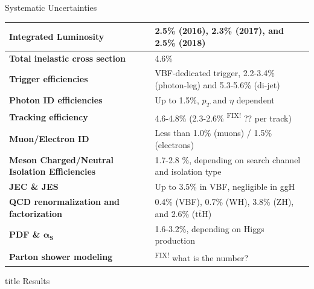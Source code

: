 \documentclass[9pt,aspectratio=1610]{beamer}
\newcommand{\pt}{\ensuremath{p_T}}
\newcommand{\ktodo}[1]{\colorbox{yellow!30}{{\color{red}\textsuperscript{\tiny FIX! }}#1}}
\begin{document}
\begin{frame}{Systematic Uncertainties}
	\begin{table}
		\small
		\begin{tabular}{l|l}
			\hline
			\textbf{Integrated Luminosity} & 2.5\% (2016), 2.3\% (2017), and 2.5\% (2018)\\
			\hline
			\textbf{Total inelastic cross section} & 4.6\%\\
			\hline
			\textbf{Trigger efficiencies} & VBF-dedicated trigger, 2.2-3.4\% (photon-leg)
			and 5.3-5.6\% (di-jet)\\
			\hline
			\textbf{Photon ID efficiencies} & Up to 1.5\%, \(\pt\) and \(\eta\) dependent\\
			\hline
			\textbf{Tracking efficiency} & 4.6-4.8\% (2.3-2.6\% \ktodo{??} per track)\\
			\hline
			\textbf{Muon/Electron ID} & Less than 1.0\% (muons) / 1.5\% (electrons)\\
			\hline
			\textbf{Meson Charged/Neutral Isolation Efficiencies} & 1.7-2.8 \%, depending on search channel and isolation type\\
			\hline
			\textbf{JEC \& JES} & Up to 3.5\% in VBF, negligible in ggH\\
			\hline
			\textbf{QCD renormalization and factorization} & 0.4\% (VBF), 0.7\% (WH), 3.8\% (ZH), and 2.6\% (\(\mathrm{t\bar{t}H}\))\\
			\hline
			\textbf{PDF \& \(\mathbf{\alpha_S}\)} & 1.6-3.2\%, depending on Higgs production\\
			\hline
			\textbf{Parton shower modeling} & \ktodo{what is the number?}\\
			\hline
		\end{tabular}
	\end{table}
\end{frame}

\begin{frame}
	\vfill
	\centering
	\begin{beamercolorbox}[sep=8pt,center,shadow=false,rounded=true]{title}
		\Huge Results \par%
	\end{beamercolorbox}
	\vfill
\end{frame}
\end{document}

